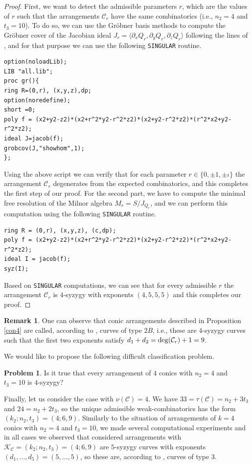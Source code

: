 \documentclass[11pt]{article}
\theoremstyle{plain}
\theoremstyle{definition}
\newtheorem{remark}[thm]{Remark}
\newtheorem{problem}[thm]{Problem}
\begin{document}
\begin{proof}
First, we want to detect the admissible parameters $r$, which are the values of $r$ such that the arrangements $\mathcal{C}_r$ have the same combinatorics (i.e., $n_{2} = 4$ and $t_{3} = 10$). To do so, we can use the Gr\"obner basis methods to compute the Gr\"obner cover of the Jacobian ideal $J_r = \langle \partial_x Q_r, \partial_{y} Q_r, \partial_{z} Q_r \rangle$ following the lines of \cite[pp. 99]{Montes}, and for that purpose we can use the following \verb}SINGULAR} routine.
\begin{verbatim}
option(noloadLib);
LIB "all.lib";
proc gr(){
ring R=(0,r), (x,y,z),dp;
option(noredefine); 
short =0;
poly f = (x2+y2-z2)*(x2+r^2*y2-r^2*z2)*(x2+y2-r^2*z2)*(r^2*x2+y2-r^2*z2);
ideal J=jacob(f);
grobcov(J,"showhom",1);
};
\end{verbatim}
Using the above script we can verify that for each parameter $r \in \{0, \pm 1, \pm \iota\}$ the arrangement $\mathcal{C}_{r}$ degenerates from the expected combinatorics, and this completes the first step of our proof. For the second part, we have to compute the minimal free resolution of the Milnor algebra $M_{r} = S / J_{Q_r}$, and we can perform this computation using the following \verb}SINGULAR} routine.
\begin{verbatim}
ring R = (0,r), (x,y,z), (c,dp);
poly f = (x2+y2-z2)*(x2+r^2*y2-r^2*z2)*(x2+y2-r^2*z2)*(r^2*x2+y2-r^2*z2);
ideal I = jacob(f);
syz(I);
\end{verbatim}

Based on \verb}SINGULAR} computations, we can see that for every admissible $r$ the arrangement $\mathcal{C}_{r}$ is $4$-syzygy with exponents $(4,5,5,5)$ and this completes our proof.
\end{proof}
\begin{remark}
One can observe that conic arrangements described in Proposition \ref{con4} are called, according to \cite[Definition 1.2]{her}, curves of type $2B$, i.e., these are $4$-syzygy curves such that the first two exponents satisfy $d_{1}+d_{2} = {\rm deg}(\mathcal{C}_{r})+1 = 9$. 
\end{remark}
We would like to propose the following difficult classification problem.
\begin{problem}
Is it true that every arrangement of $4$ conics with $n_{2}=4$ and $t_{3}=10$ is $4$-syzygy?
\end{problem}

Finally, let us consider the case with $\nu(\mathcal{C}) = 4$. We have $33=\tau(\mathcal{C})=n_{2}+3t_{3}$ and $24 = n_{2}+2t_{3}$, so the unique admissible weak-combinatorics has the form $(k_{2};n_{2},t_{3}) = (4;6,9)$. Similarly to the situation of arrangements of $k=4$ conics with $n_{2}=4$ and $t_{3}=10$, we made several computational experiments and in all cases we observed that considered arrangements with $\mathcal{K}_{\mathcal{C}} = (k_{2};n_{2},t_{3}) = (4;6,9)$ are $5$-syzygy curves with exponents $(d_{1}, \ldots ,d_{5}) = (5, \ldots, 5)$, so these are, according to \cite[Definition 1.2]{her}, curves of type $3$.
\end{document}
